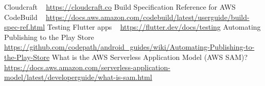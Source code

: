 \documentclass[10pt, a4paper]{article}
\begin{document}
	
\begin{thebibliography}{9}
Cloudcraft ~ \url{https://cloudcraft.co}
Build Specification Reference for AWS CodeBuild ~ \url{https://docs.aws.amazon.com/codebuild/latest/userguide/build-spec-ref.html}
Testing Flutter apps ~ \url{https://flutter.dev/docs/testing}
Automating Publishing to the Play Store ~ \url{https://github.com/codepath/android_guides/wiki/Automating-Publishing-to-the-Play-Store}
What is the AWS Serverless Application Model (AWS SAM)? ~ \url{https://docs.aws.amazon.com/serverless-application-model/latest/developerguide/what-is-sam.html}
\end{thebibliography}
\end{document}
